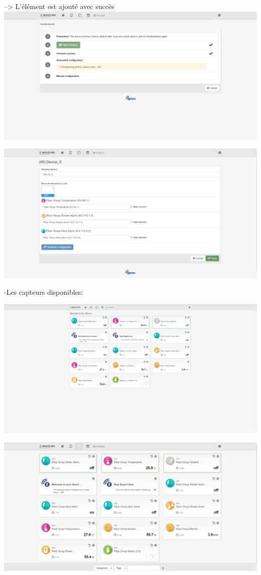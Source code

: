 --> L'élément est ajouté avec succès
\includegraphics[scale=0.5]{./Images/png/add3_zwaveme.png}\newline

\includegraphics[scale=0.5]{./Images/png/add4_zwaveme.png}\newline


-Les capteurs disponibles:

\includegraphics[scale=0.5]{./Images/png/ecranCapteur.png}\newline

\includegraphics[scale=0.5]{./Images/png/device_zwaveme.png}\newline


